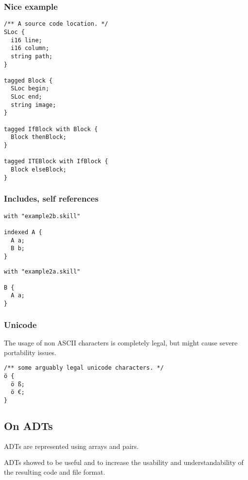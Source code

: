\documentclass[a4paper,10pt]{article}
\begin{document}
\subsubsection*{Nice example}

\begin{lstlisting}[label=blockExample,caption=Running Example,language=skill]
/** A source code location. */
SLoc {
  i16 line;
  i16 column;
  string path;
}

tagged Block {
  SLoc begin;
  SLoc end;
  string image;
}

tagged IfBlock with Block {
  Block thenBlock;
}

tagged ITEBlock with IfBlock {
  Block elseBlock;
}
\end{lstlisting}

\subsubsection*{Includes, self references}

\begin{lstlisting}[label=example2a,caption=Example 2a,language=skill]
with "example2b.skill"

indexed A {
  A a;
  B b;
}
\end{lstlisting}

\begin{lstlisting}[label=example2b,caption=Example 2b,language=skill]
with "example2a.skill"

B {
  A a;
}
\end{lstlisting}

\subsubsection*{Unicode}
The usage of non ASCII characters is completely legal, but might cause severe portability issues.
\begin{lstlisting}[label=unicode,caption=Unicode Support,language=skill]
/** some arguably legal unicode characters. */
ö {
  ö ß;
  ö €;
}
\end{lstlisting}


\subsection{On ADTs}

ADTs are represented using arrays and pairs.

ADTs showed to be useful and to increase the usability and understandability of the resulting code and file format.
\end{document}

